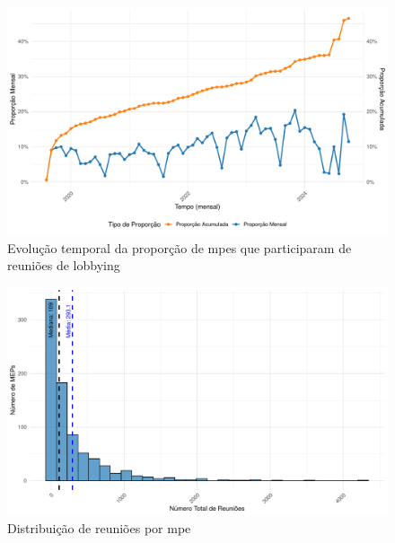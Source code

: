 \begin{figure}[htbp]
    \centering
    \includegraphics[width=\textwidth]{figures/descriptive_plots/fig2_proportion_meetings.pdf}
    \caption{Evolução temporal da proporção de \acrshort{mpe}s que participaram de reuniões de lobbying}
    \label{fig:proportion_meetings}
\end{figure}

\begin{figure}[htbp]
    \centering
    \includegraphics[width=\textwidth]{figures/descriptive_plots/fig3.1_meetings_hist.pdf}
    \caption{Distribuição de reuniões por \acrshort{mpe}}
    \label{fig:meetings_hist}
\end{figure}


